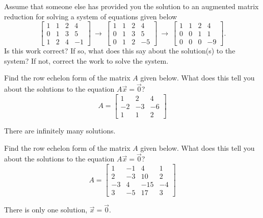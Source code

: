 \begin{exercise}\ansMark%
Assume that someone else has provided you the solution to an augmented matrix reduction for solving a system of equations given below
\begin{equation*}
\begin{bmatrix}
1 & 1 & 2 & 4 \\
0 & 1 & 3 & 5 \\
1 & 2 & 4 & -1
\end{bmatrix} \ \rightarrow \ \begin{bmatrix} 1 & 1 & 2 & 4 \\ 0 & 1 & 3 & 5 \\ 0 & 1 & 2 & -5 \end{bmatrix} \ \rightarrow \ \begin{bmatrix} 1 & 1 & 2 & 4 \\ 0 & 0 & 1 & 1 \\ 0 & 0 & 0 & -9 \end{bmatrix}.
\end{equation*} 
Is this work correct? If so, what does this say about the solution(s) to the system? If not, correct the work to solve the system.
\end{exercise}

\begin{exercise}
Find the row echelon form of the matrix $A$ given below. What does this tell you about the solutions to the equation $A\vec{x} = \vec{0}$?
\begin{equation*}
A = \begin{bmatrix} 1 & 2 & 4 \\ -2 & -3 & -6 \\ 1 & 1 & 2 \end{bmatrix}
\end{equation*}
\end{exercise}
\comboSol{%
}
{%
There are infinitely many solutions. 
}


\begin{exercise}
Find the row echelon form of the matrix $A$ given below. What does this tell you about the solutions to the equation $A\vec{x} = \vec{0}$?
\begin{equation*}
A = \begin{bmatrix} 1 & -1 & 4 & 1 \\ 2 & -3 & 10 & 2 \\ -3 & 4 & -15 & -4 \\ 3 & -5 & 17 & 3 \end{bmatrix}
\end{equation*}
\end{exercise}
\comboSol{%
}
{%
There is only one solution, $\vec{x} = \vec{0}$. 
}


\setcounter{exercise}{100}

